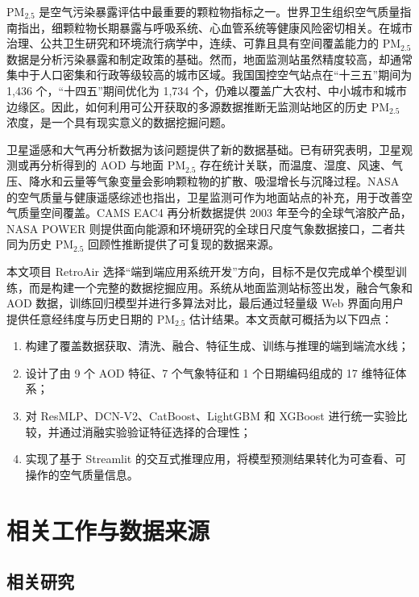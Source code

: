 \documentclass[UTF8,zihao=-4,a4paper]{ctexart}
\newcommand{\pmfine}{PM$_{2.5}$}
\newcommand{\aod}{AOD}
\begin{document}
\pmfine{} 是空气污染暴露评估中最重要的颗粒物指标之一。世界卫生组织空气质量指南指出，细颗粒物长期暴露与呼吸系统、心血管系统等健康风险密切相关\cite{who2021}。在城市治理、公共卫生研究和环境流行病学中，连续、可靠且具有空间覆盖能力的 \pmfine{} 数据是分析污染暴露和制定政策的基础。然而，地面监测站虽然精度较高，却通常集中于人口密集和行政等级较高的城市区域。我国国控空气站点在“十三五”期间为 1,436 个，“十四五”期间优化为 1,734 个，仍难以覆盖广大农村、中小城市和城市边缘区\cite{mee2020}。因此，如何利用可公开获取的多源数据推断无监测站地区的历史 \pmfine{} 浓度，是一个具有现实意义的数据挖掘问题。

卫星遥感和大气再分析数据为该问题提供了新的数据基础。已有研究表明，卫星观测或再分析得到的 \aod{} 与地面 \pmfine{} 存在统计关联\cite{xin2016,zheng2017}，而温度、湿度、风速、气压、降水和云量等气象变量会影响颗粒物的扩散、吸湿增长与沉降过程。NASA 的空气质量与健康遥感综述也指出，卫星监测可作为地面站点的补充，用于改善空气质量空间覆盖\cite{holloway2023}。CAMS EAC4 再分析数据提供 2003 年至今的全球气溶胶产品\cite{cams}，NASA POWER 则提供面向能源和环境研究的全球日尺度气象数据接口\cite{nasa_power}，二者共同为历史 \pmfine{} 回顾性推断提供了可复现的数据来源。

本文项目 RetroAir 选择“端到端应用系统开发”方向，目标不是仅完成单个模型训练，而是构建一个完整的数据挖掘应用。系统从地面监测站标签出发，融合气象和 \aod{} 数据，训练回归模型并进行多算法对比，最后通过轻量级 Web 界面向用户提供任意经纬度与历史日期的 \pmfine{} 估计结果。本文贡献可概括为以下四点：

\begin{enumerate}
  \item 构建了覆盖数据获取、清洗、融合、特征生成、训练与推理的端到端流水线；
  \item 设计了由 9 个 \aod{} 特征、7 个气象特征和 1 个日期编码组成的 17 维特征体系；
  \item 对 ResMLP、DCN-V2、CatBoost、LightGBM 和 XGBoost 进行统一实验比较，并通过消融实验验证特征选择的合理性；
  \item 实现了基于 Streamlit 的交互式推理应用，将模型预测结果转化为可查看、可操作的空气质量信息。
\end{enumerate}

\section{相关工作与数据来源}

\subsection{相关研究}
\end{document}
